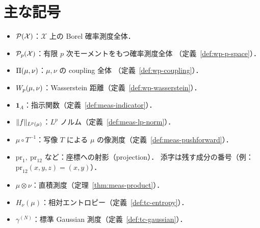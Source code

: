 \section*{主な記号}

\begin{itemize}
  \item $\mathcal{P}(\mathcal{X})$：$\mathcal{X}$ 上の Borel 確率測度全体．
  \item $\mathcal{P}_{p}(\mathcal{X})$：有限 $p$ 次モーメントをもつ確率測度全体
    （定義~\ref{def:wp-p-space}）．
  \item $\Pi(\mu,\nu)$：$\mu,\nu$ の coupling 全体
    （定義~\ref{def:wp-coupling}）．
  \item $W_p(\mu,\nu)$：Wasserstein 距離（定義~\ref{def:wp-wasserstein}）．
  \item $\mathbf{1}_A$：指示関数（定義~\ref{def:meas-indicator}）．
  \item $\lVert f \rVert_{L^p(\mu)}$：$L^p$ ノルム（定義~\ref{def:meas-lp-norm}）．
  \item $\mu\circ T^{-1}$：写像 $T$ による $\mu$ の像測度（定義~\ref{def:meas-pushforward}）．
  \item $\mathrm{pr}_1,\ \mathrm{pr}_{12}$ など：座標への射影（projection）．
    添字は残す成分の番号（例：$\mathrm{pr}_{12}(x,y,z)=(x,y)$）．
  \item $\mu\otimes\nu$：直積測度（定理~\ref{thm:meas-product}）．
  \item $H_\nu(\mu)$：相対エントロピー（定義~\ref{def:tc-entropy}）．
  \item $\gamma^{(N)}$：標準 Gaussian 測度（定義~\ref{def:tc-gaussian}）．
\end{itemize}

